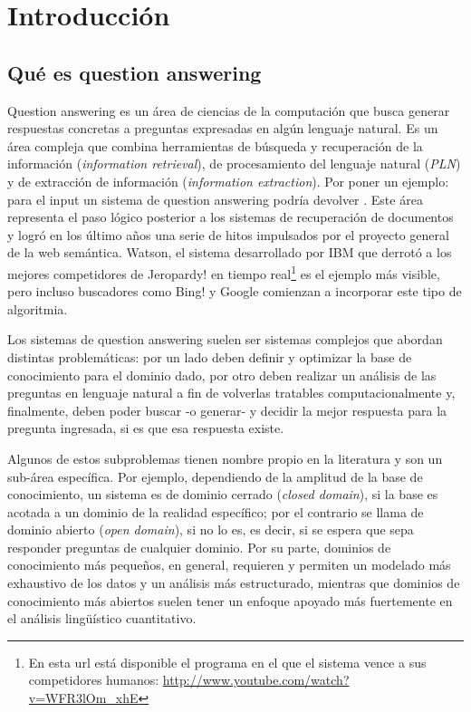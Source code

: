 
\chapter{Introducción}
\label{chap:intro}\label{chap:1}


\section{Qué es question answering}
\label{sec:que-es-qa}

Question answering es un área de ciencias de la computación que busca generar respuestas concretas a preguntas expresadas en algún lenguaje natural. Es un área compleja que combina herramientas de búsqueda y recuperación de la información (\textit{information retrieval}), de procesamiento del lenguaje natural (\textit{PLN}) y de extracción de información (\textit{information extraction}). Por poner un ejemplo: para el input \textit{} un sistema de question answering podría devolver .
Este área representa el paso lógico posterior a los sistemas de recuperación de documentos y logró en los último años una serie de hitos impulsados por el proyecto general de la web semántica. Watson, el sistema desarrollado por IBM que derrotó a los mejores competidores de Jeropardy! en tiempo real\footnote{En esta url está disponible el programa en el que el sistema vence a sus competidores humanos: \url{http://www.youtube.com/watch?v=WFR3lOm_xhE}} es el ejemplo más visible, pero incluso buscadores como Bing! y Google comienzan a incorporar este tipo de algoritmia.

Los sistemas de question answering suelen ser sistemas complejos que abordan distintas problemáticas: por un lado deben definir y optimizar la base de conocimiento para el dominio dado, por otro deben realizar un análisis de las preguntas en lenguaje natural a fin de volverlas
tratables computacionalmente y, finalmente, deben poder buscar -o generar- y decidir la mejor respuesta para la pregunta ingresada, si es que esa respuesta existe.

Algunos de estos subproblemas tienen nombre propio en la literatura y son un sub-área específica. Por ejemplo, dependiendo de la amplitud de la base de conocimiento, un sistema es de dominio cerrado (\textit{closed domain}), si la base es acotada a un dominio de la realidad específico; por el contrario se llama de dominio abierto (\textit{open domain}), si no lo es, es decir, si se espera que sepa responder preguntas de cualquier dominio. Por su parte, dominios de conocimiento más pequeños, en general, requieren y permiten un modelado más exhaustivo
de los datos y un análisis más estructurado, mientras que dominios de conocimiento más abiertos suelen
tener un enfoque apoyado más fuertemente en el análisis lingüístico cuantitativo.

